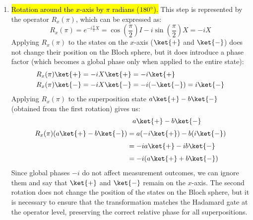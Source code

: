 \begin{enumerate}
\begin{itemize}
\begin{align*}
\begin{pmatrix}
                1 \\ 0
            \end{pmatrix}\right) \\[.3em]
            &= \dfrac{1}{\sqrt{2}} \left(\ket{1} - \ket{0}\right) \\[.3em]
            &= -\dfrac{\ket{0} - \ket{1}}{\sqrt{2}} \\[.3em]
            &= -\ket{-}
        \end{align*}
        This means that $\ket{1}$, the south pole of the Bloch sphere, moves to the $-x$-axis, but with a global phase of $-1$. Since global phases do not affect measurement outcomes, we can ignore it and say that $\ket{1}$ is effectively rotated to the $-x$-axis, which is the $\ket{-}$ state. In simple terms: $-\ket{-} \equiv \ket{-}$ up to a global phase.
    \end{itemize}

    \item \hl{Rotation around the $x$-axis by $\pi$ radians ($180^\circ$).} This step is represented by the operator $R_x(\pi)$, which can be expressed as:
    \begin{equation*}
        R_x(\pi) = e^{-i\frac{\pi}{2}X} = \cos\left(\frac{\pi}{2}\right)I - i\sin\left(\frac{\pi}{2}\right)X = -iX
    \end{equation*}
    Applying $R_x(\pi)$ to the states on the $x$-axis ($\ket{+}$ and $\ket{-}$) does not change their position on the Bloch sphere, but it does introduce a phase factor (which becomes a global phase only when applied to the entire state):
    \begin{align*}
        R_x(\pi)\ket{+} &= -iX\ket{+} = -i\ket{+} \\
        R_x(\pi)\ket{-} &= -iX\ket{-} = -i(-\ket{-}) = i\ket{-}
    \end{align*}
    Applying $R_x(\pi)$ to the superposition state $a\ket{+} - b\ket{-}$ (obtained from the first rotation) gives us:
    \begin{align*}
        &\phantom{=} a\ket{+} - b\ket{-} \\[.3em]
        R_x(\pi)(a\ket{+} - b\ket{-}) &= a(-i\ket{+}) - b(i\ket{-}) \\[.3em]
        &= -ia\ket{+} - ib\ket{-} \\[.3em]
        &= -i(a\ket{+} + b\ket{-})
    \end{align*}
    Since global phases $-i$ do not affect measurement outcomes, we can ignore them and say that $\ket{+}$ and $\ket{-}$ remain on the $x$-axis. The second rotation does not change the position of the states on the Bloch sphere, but it is necessary to ensure that the transformation matches the Hadamard gate at the operator level, preserving the correct relative phase for all superpositions.


\end{enumerate}
